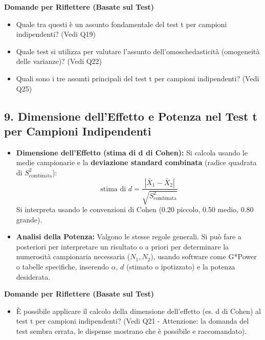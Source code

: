 \documentclass[12pt, a4paper]{article}
\newenvironment{reflectionbox}{%
    \medskip
    \begin{framed}\par\noindent
    \textbf{\color{boxtitlecolor}Domande per Riflettere (Basate sul Test)} \par
    \begin{itemize}[leftmargin=*, label=$\blacktriangleright$]
}{%
    \end{itemize}\par
    \end{framed}
    \medskip
}
\newcommand{\samplemean}{\bar{X}}
\newcommand{\alphaerr}{\alpha} %
\newcommand{\cohend}{d} %
\newcommand{\Spool}{S^2_{\text{combinata}}} %
\begin{document}
\begin{reflectionbox}
    \item Quale tra questi è un assunto fondamentale del test t per campioni indipendenti? (Vedi Q19)
    \item Quale test si utilizza per valutare l'assunto dell'omoschedasticità (omogeneità delle varianze)? (Vedi Q22)
    \item Quali sono i tre assunti principali del test t per campioni indipendenti? (Vedi Q25)
\end{reflectionbox}

\subsection*{9. Dimensione dell'Effetto e Potenza nel Test t per Campioni Indipendenti}
\begin{itemize}
    \item \textbf{Dimensione dell'Effetto (stima di d di Cohen):} Si calcola usando le medie campionarie e la \textbf{deviazione standard combinata} (radice quadrata di $\Spool$):
      $$ \text{stima di } \cohend = \frac{|\samplemean_1 - \samplemean_2|}{\sqrt{\Spool}} $$
      Si interpreta usando le convenzioni di Cohen (0.20 piccolo, 0.50 medio, 0.80 grande).
    \item \textbf{Analisi della Potenza:} Valgono le stesse regole generali. Si può fare a posteriori per interpretare un risultato o a priori per determinare la numerosità campionaria necessaria ($N_1, N_2$), usando software come G*Power o tabelle specifiche, inserendo $\alphaerr$, $d$ (stimato o ipotizzato) e la potenza desiderata.
\end{itemize}

\begin{reflectionbox}
    \item È possibile applicare il calcolo della dimensione dell'effetto (es. d di Cohen) al test t per campioni indipendenti? (Vedi Q21 - Attenzione: la domanda del test sembra errata, le dispense mostrano che è possibile e raccomandato).
\end{reflectionbox}
\end{document}
